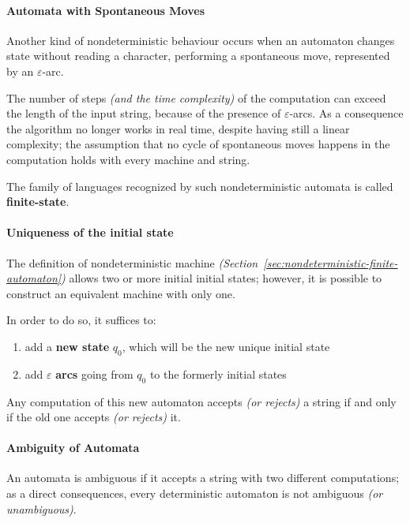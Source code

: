 \documentclass[english]{article}
\begin{document}
\paragraph{Automata with Spontaneous Moves}

Another kind of nondeterministic behaviour occurs when an automaton changes state without reading a character, performing a spontaneous move, represented by an \(\varepsilon\)-arc.

The number of steps \textit{(and the time complexity)} of the computation can exceed the length of the input string, because of the presence of \(\varepsilon\)-arcs.
As a consequence the algorithm no longer works in real time, despite having still a linear complexity;
the assumption that no cycle of spontaneous moves happens in the computation holds with every machine and string.

The family of languages recognized by such nondeterministic automata is called \textbf{finite-state}.

\paragraph{Uniqueness of the initial state}

The definition of nondeterministic machine \textit{(Section~\ref{sec:nondeterministic-finite-automaton})} allows two or more initial initial states;
however, it is possible to construct an equivalent machine with only one.

In order to do so, it suffices to:

\begin{enumerate}
  \item add a \textbf{new state} \(q_0\), which will be the new unique initial state
  \item add \(\varepsilon\) \textbf{arcs} going from \(q_0\) to the formerly initial states
\end{enumerate}

Any computation of this new automaton accepts \textit{(or rejects)} a string if and only if the old one accepts \textit{(or rejects)} it.

\paragraph{Ambiguity of Automata}

An automata is ambiguous if it accepts a string with two different computations;
as a direct consequences, every deterministic automaton is not ambiguous \textit{(or unambiguous)}.
\end{document}
